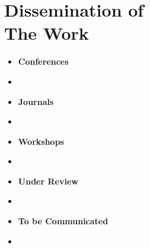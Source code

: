 \chapter[Dissemination of The Work]{Dissemination of \\ The Work}
\begin{itemize}

\item[]  \hspace{0pt plus 1filll}  \textbf{Conferences}

\item 
	
\item[]  \hspace{0pt plus 1filll}  \textbf{Journals}
	
	\item 
	
\item[]  \hspace{0pt plus 1filll}  \textbf{Workshops}

	\item 

\item[]  \hspace{0pt plus 1filll}  \textbf{Under Review}

	\item 


\item[] \hspace{0pt plus 1filll}  \textbf{To be Communicated}

	\item 


\end{itemize}